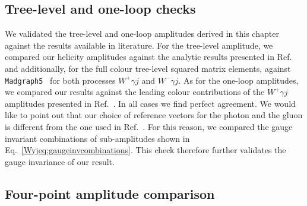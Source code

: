\documentclass[main.tex]{subfiles}
\begin{document}


\subsection{Tree-level and one-loop checks}

We validated the tree-level and one-loop amplitudes derived in this chapter against the results available in literature.
For the tree-level amplitude, we compared our helicity amplitudes against the analytic results presented in Ref.~\cite{Campbell:2021mlr} and additionally, for the full colour tree-level squared matrix elements, against \texttt{Madgraph5}~\cite{Alwall:2014hca} for both processes $W^+\gamma j$ and $W^-\gamma j$.
As for the one-loop amplitudes, we compared our results against the leading colour contributions of the $W^+\gamma j$ amplitudes presented in Ref.~\cite{Campbell:2021mlr}.
In all cases we find perfect agreement.
We would like to point out that our choice of reference vectors for the photon and the gluon is different from the one used in Ref.~\cite{Campbell:2021mlr}. For this reason, we compared the gauge invariant combinations of sub-amplitudes shown in Eq.~\ref{Wyjeq:gaugeinvcombinations}. This check therefore further validates the gauge invariance of our result.


\subsection{Four-point amplitude comparison}
\label{subwyjsec:4ptcomparison}
\end{document}

